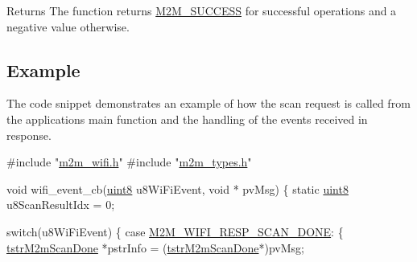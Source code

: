 \begin{DoxyReturn}{Returns}
The function returns \hyperlink{nm__common_8h_a9ef27ba27aafdd1aa3a79d3ba2c36b8f}{M2\+M\+\_\+\+S\+U\+C\+C\+E\+SS} for successful operations and a negative value otherwise. 
\end{DoxyReturn}
\hypertarget{group__WifiEnableMonitorModeFn_Example}{}\subsection{Example}\label{group__WifiEnableMonitorModeFn_Example}
The code snippet demonstrates an example of how the scan request is called from the application\textquotesingle{}s main function and the handling of the events received in response. 
\begin{DoxyCode}
\textcolor{preprocessor}{#include "\hyperlink{m2m__wifi_8h}{m2m\_wifi.h}"}
\textcolor{preprocessor}{#include "\hyperlink{m2m__types_8h}{m2m\_types.h}"}

\textcolor{keywordtype}{void} wifi\_event\_cb(\hyperlink{group__DataT_ga4df709a77647e870bbf1d955b8edc9a6}{uint8} u8WiFiEvent, \textcolor{keywordtype}{void} * pvMsg)
\{
    \textcolor{keyword}{static} \hyperlink{group__DataT_ga4df709a77647e870bbf1d955b8edc9a6}{uint8}    u8ScanResultIdx = 0;
    
    \textcolor{keywordflow}{switch}(u8WiFiEvent)
    \{
    \textcolor{keywordflow}{case} \hyperlink{group__WlanEnums_gga064de09dec1d5e88ed8d075fa40f57dead835febbe18b7e3cc6ce4693951354fe}{M2M\_WIFI\_RESP\_SCAN\_DONE}:
        \{
            \hyperlink{structtstrM2mScanDone}{tstrM2mScanDone} *pstrInfo = (\hyperlink{structtstrM2mScanDone}{tstrM2mScanDone}*)pvMsg;
            

\end{DoxyCode}
